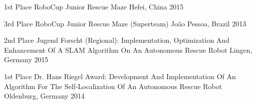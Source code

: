 



\begin{cvhonors}

  \cvhonor
    {1st Place} %
    {RoboCup Junior Rescue Maze} %
    {Hefei, China} %
    {2015} %

  \cvhonor
    {3rd Place} %
    {RoboCup Junior Rescue Maze (Superteam)} %
    {João Pessoa, Brazil} %
    {2013} %

\end{cvhonors}




\begin{cvhonors}

  \cvhonor
    {2nd Place} %
    {Jugend Forscht (Regional): Implementation, Optimization And Enhancement Of A SLAM Algorithm On An Autonomous Rescue Robot} %
    {Lingen, Germany} %
    {2015} %

  \cvhonor
    {1st Place} %
    {Dr. Hans Riegel Award: Development And Implementation Of An Algorithm For The Self-Localization Of An Autonomous Rescue Robot} %
    {Oldenburg, Germany} %
    {2014} %

\end{cvhonors}
